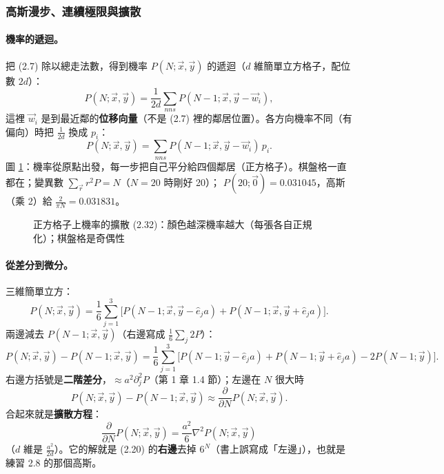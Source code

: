 \subsubsection{高斯漫步、連續極限與擴散}

\paragraph{機率的遞迴。}
把 (2.7) 除以總走法數，得到機率 $P(N;\vec x,\vec y)$ 的遞迴（$d$ 維簡單立方格子，配位數 $2d$）：
\[P(N;\vec x,\vec y)=\frac1{2d}\sum_{nns}P(N-1;\vec x,\vec y-\vec w_i),\tag{2.32}\]
這裡 $\vec w_i$ 是到最近鄰的\textbf{位移向量}（不是 (2.7) 裡的鄰居位置）。各方向機率不同（有偏向）時把 $\frac1{2d}$ 換成 $p_i$：
\[P(N;\vec x,\vec y)=\sum_{nns}P(N-1;\vec x,\vec y-\vec w_i)\,p_i.\tag{2.33}\]
圖 \ref{twofig-diffusion}：機率從原點出發，每一步把自己平分給四個鄰居（正方格子）。棋盤格一直都在；變異數 $\sum_{\vec r}r^2P=N$（$N=20$ 時剛好 20）；
$P(20;\vec0)=0.031045$，高斯（乘 2）給 $\frac2{\pi N}=0.031831$。
\begin{figure}[H]
\centering
\TwoFigDiffusion
\caption{正方格子上機率的擴散 (2.32)：顏色越深機率越大（每張各自正規化）；棋盤格是奇偶性}\label{twofig-diffusion}
\end{figure}

\paragraph{從差分到微分。}
三維簡單立方：
\[P(N;\vec x,\vec y)=\frac16\sum_{j=1}^3\big[P(N-1;\vec x,\vec y-\hat e_ja)+P(N-1;\vec x,\vec y+\hat e_ja)\big].\tag{2.34}\]
兩邊減去 $P(N-1;\vec x,\vec y)$（右邊寫成 $\frac16\sum_j2P$）：
\[P(N;\vec x,\vec y)-P(N-1;\vec x,\vec y)=\frac16\sum_{j=1}^3\big[P(N-1;\vec y-\hat e_ja)+P(N-1;\vec y+\hat e_ja)-2P(N-1;\vec y)\big].\tag{2.35}\]
右邊方括號是\textbf{二階差分}，$\approx a^2\partial_j^2P$（第 1 章 1.4 節）；左邊在 $N$ 很大時
\[P(N;\vec x,\vec y)-P(N-1;\vec x,\vec y)\approx\frac{\partial}{\partial N}P(N;\vec x,\vec y).\tag{2.36}\]
合起來就是\textbf{擴散方程}：
\[\frac{\partial}{\partial N}P(N;\vec x,\vec y)=\frac{a^2}6\nabla^2P(N;\vec x,\vec y)\tag{2.37}\]
（$d$ 維是 $\frac{a^2}{2d}$）。它的解就是 (2.20) 的\textbf{右邊}去掉 $6^N$（書上誤寫成「左邊」），也就是練習 2.8 的那個高斯。

